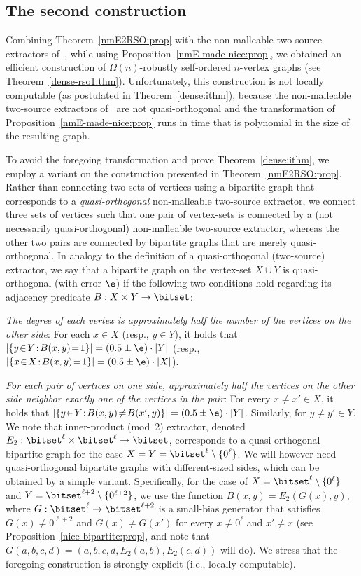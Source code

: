%
%
%
%

\subsection{The second construction}
\label{dense:rso2:sec}
Combining Theorem~\ref{nmE2RSO:prop}
with the non-malleable two-source extractors of~\cite[Thm.~1]{CGL},
while using Proposition~\ref{nmE-made-nice:prop},
we obtained an efficient construction
of $\Omega(n)$-robustly self-ordered $n$-vertex graphs
(see Theorem~\ref{dense-rso1:thm}).
%
%
%
Unfortunately, this construction is not locally computable
(as postulated in Theorem~\ref{dense:ithm}),
because the non-malleable two-source extractors of~\cite[Thm.~1]{CGL}
are not quasi-orthogonal and the transformation
of Proposition~\ref{nmE-made-nice:prop} runs in time
that is polynomial in the size of the resulting graph.

To avoid the foregoing transformation and prove Theorem~\ref{dense:ithm},
we employ a variant on the construction presented
in Theorem~\ref{nmE2RSO:prop}.
Rather than connecting two sets of vertices using
a bipartite graph that corresponds to
a {\em quasi-orthogonal}\/ non-malleable two-source extractor,
we connect three sets of vertices such that one pair
of vertex-sets is connected by a (not necessarily quasi-orthogonal)
non-malleable two-source extractor, whereas the other two pairs
are connected by bipartite graphs that are merely quasi-orthogonal.
In analogy to the definition of a quasi-orthogonal (two-source) extractor,
we say that a bipartite graph on the vertex-set $X\cup Y$
is {\sf quasi-orthogonal} (with error $\e$)
if the following two conditions hold regarding
its adjacency predicate $B:X\times Y\to\bitset$:
\BE
\item
{\em The degree of each vertex is approximately half
the number of the vertices on the other side}:
For each $x\in X$ (resp., $y\in Y$), it holds that
$|\{y\!\in\!Y\!:\!B(x,y)\!=\!1\}|=(0.5\pm\e)\cdot|Y|$
(resp., $|\{x\!\in\!X\!:\!B(x,y)\!=\!1\}|=(0.5\pm\e)\cdot|X|$).
%
%
\item
%
%
{\em For each pair of vertices on one side,
approximately half the vertices on the other side
neighbor exactly one of the vertices in the pair}:
For every $x\neq x'\in X$, it holds that
$|\{y\!\in\!Y\!:\!B(x,y)\!\neq\!B(x',y)\}|=(0.5\pm\e)\cdot|Y|$.
%
%
Similarly, for $y\neq y'\in Y$.
\EE
We note that inner-product (mod~2) extractor,
denoted $E_2:\bitset^\ell\times\bitset^\ell\to\bitset$,
corresponds to a quasi-orthogonal bipartite graph for
the case $X=Y=\bitset^\ell\setminus\{0^\ell\}$.
We will however need quasi-orthogonal bipartite graphs with
different-sized sides, which can be obtained by a simple variant.
Specifically, for the case of $X=\bitset^\ell\setminus\{0^\ell\}$
and $Y=\bitset^{\ell+2}\setminus\{0^{\ell+2}\}$,
we use the function $B(x,y)=E_2(G(x),y)$,
where $G:\bitset^\ell\to\bitset^{\ell+2}$
is a small-bias generator that satisfies $G(x)\neq0^{\ell+2}$
and $G(x)\neq G(x')$ for every $x\neq0^\ell$ and $x'\neq x$
(see Proposition~\ref{nice-bipartite:prop},
and note that $G(a,b,c,d)=(a,b,c,d,E_2(a,b),E_2(c,d))$ will do).
We stress that the foregoing construction is strongly explicit
(i.e., locally computable).
%
%
%


